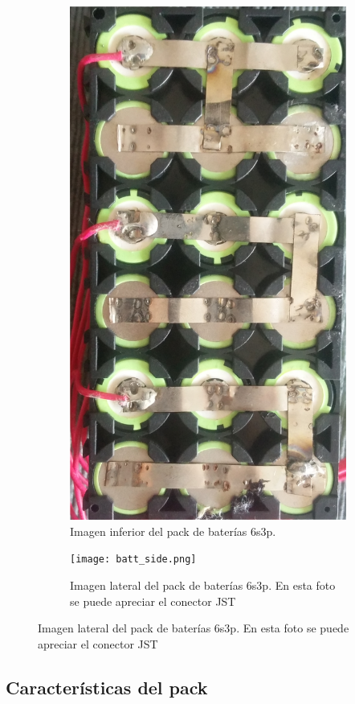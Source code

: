 \documentclass[10pt, a4paper]{report}
\begin{document}
\begin{figure}[h!]
\begin{subfigure}[b]{.3\textwidth}
	\centering
	\includegraphics[width=.9\textwidth]{battery_bot.png}
	\caption{Imagen inferior del pack de bater\'ias 6s3p.}
	\label{battery_bot}
    \end{subfigure}
    \begin{subfigure}[b]{.3\textwidth}
	\centering
	\texttt{[image: batt\_side.png]}
	\caption{Imagen lateral del pack de bater\'ias 6s3p. En esta foto se puede
    apreciar el conector JST}
	\label{battery_side}
    \end{subfigure}
\end{figure}
\FloatBarrier

\subsection{Caracter\'isticas del pack}\label{caract_pack}
\end{document}

